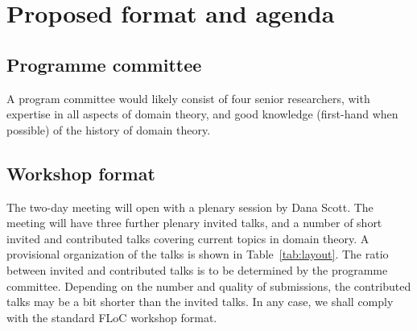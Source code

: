 \documentclass{article}
\begin{document}
\section{Proposed format and agenda}

\subsection{Programme committee}

A program committee would likely consist of four senior researchers, with expertise in all
aspects of domain theory, and good knowledge (first-hand when possible) of the history of
domain theory.


\subsection{Workshop format}

The two-day meeting will open with a plenary session by Dana Scott.
The meeting will have three further plenary invited talks, and a
number of short invited and contributed talks covering current topics
in domain theory. A provisional organization of the talks is shown in
Table~\ref{tab:layout}. The ratio between invited and contributed
talks is to be determined by the programme committee. Depending on the
number and quality of submissions, the contributed talks may be a bit
shorter than the invited talks. In any case, we shall comply with the
standard FLoC workshop format.
\end{document}
